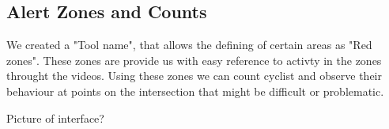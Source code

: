 \documentclass[
10pt, %
a4paper, %
oneside, %
headinclude,footinclude, %
] {book}%
\begin{document}
\subsection{Alert Zones and Counts}

We created a "Tool name", that allows the defining of certain areas as "Red zones". These zones are provide us with easy reference to activty in the zones throught the videos.
Using these zones we can count cyclist and observe their behaviour at points on the intersection that might be difficult or
problematic.

Picture of interface?





\end{document}
